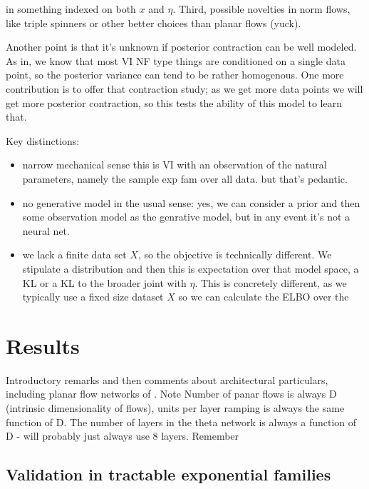 \documentclass{article}
\begin{document}
in something indexed on both $x$ and $\eta$.  Third, possible novelties in norm flows, like triple spinners or other better choices than planar flows (yuck).

  Another point is that it's unknown if posterior contraction can be well modeled.  As in, we know that most VI NF type things are conditioned on a single data point, so the posterior variance can tend to be rather homogenous.  One more contribution is to offer that contraction study; as we get more data points we will get more posterior contraction, so this tests the ability of this model to learn that.
  
  Key distinctions:
  \begin{itemize}
  \item narrow mechanical sense this is VI with an observation of the natural parameters, namely the sample exp fam over all data.  but that's pedantic.
  \item no generative model in the usual sense: yes, we can consider a prior and then some observation model as the genrative model, but in any event it's not a neural net.
  \item we lack a finite data set $X$, so the objective is technically different.  We stipulate a distribution and then this is expectation over that model space, a KL or a KL to the broader joint with $\eta$.  This is concretely different, as we typically use a fixed size dataset $X$ so we can calculate the ELBO over the 
  \end{itemize}
  

 
 


  
\section{Results}

Introductory remarks and then comments about architectural particulars, including planar flow networks of \cite{rezende2015variational}. Note Number of panar flows is always D (intrinsic dimensionality of flows), units per layer ramping is always the same function of D.  The number of layers in the theta network is always a function of D - will probably just always use 8 layers.
Remember 

\subsection{Validation in tractable exponential families}
\end{document}
